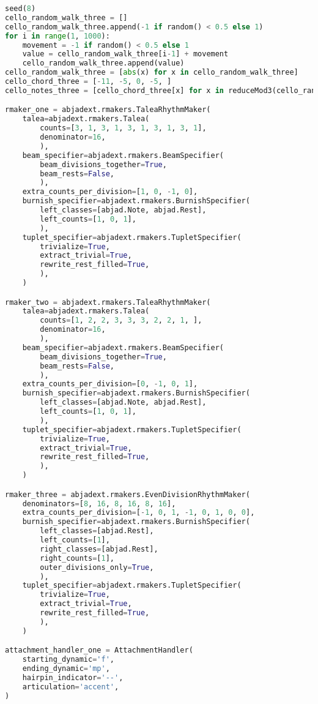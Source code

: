 \begin{lstlisting}[language=Python, caption=Four Ages of Sand Segment\_II]
seed(8)
cello_random_walk_three = []
cello_random_walk_three.append(-1 if random() < 0.5 else 1)
for i in range(1, 1000):
    movement = -1 if random() < 0.5 else 1
    value = cello_random_walk_three[i-1] + movement
    cello_random_walk_three.append(value)
cello_random_walk_three = [abs(x) for x in cello_random_walk_three]
cello_chord_three = [-11, -5, 0, -5, ]
cello_notes_three = [cello_chord_three[x] for x in reduceMod3(cello_random_walk_three)]

rmaker_one = abjadext.rmakers.TaleaRhythmMaker(
    talea=abjadext.rmakers.Talea(
        counts=[3, 1, 3, 1, 3, 1, 3, 1, 3, 1],
        denominator=16,
        ),
    beam_specifier=abjadext.rmakers.BeamSpecifier(
        beam_divisions_together=True,
        beam_rests=False,
        ),
    extra_counts_per_division=[1, 0, -1, 0],
    burnish_specifier=abjadext.rmakers.BurnishSpecifier(
        left_classes=[abjad.Note, abjad.Rest],
        left_counts=[1, 0, 1],
        ),
    tuplet_specifier=abjadext.rmakers.TupletSpecifier(
        trivialize=True,
        extract_trivial=True,
        rewrite_rest_filled=True,
        ),
    )

rmaker_two = abjadext.rmakers.TaleaRhythmMaker(
    talea=abjadext.rmakers.Talea(
        counts=[1, 2, 2, 3, 3, 3, 2, 2, 1, ],
        denominator=16,
        ),
    beam_specifier=abjadext.rmakers.BeamSpecifier(
        beam_divisions_together=True,
        beam_rests=False,
        ),
    extra_counts_per_division=[0, -1, 0, 1],
    burnish_specifier=abjadext.rmakers.BurnishSpecifier(
        left_classes=[abjad.Note, abjad.Rest],
        left_counts=[1, 0, 1],
        ),
    tuplet_specifier=abjadext.rmakers.TupletSpecifier(
        trivialize=True,
        extract_trivial=True,
        rewrite_rest_filled=True,
        ),
    )

rmaker_three = abjadext.rmakers.EvenDivisionRhythmMaker(
    denominators=[8, 16, 8, 16, 8, 16],
    extra_counts_per_division=[-1, 0, 1, -1, 0, 1, 0, 0],
    burnish_specifier=abjadext.rmakers.BurnishSpecifier(
        left_classes=[abjad.Rest],
        left_counts=[1],
        right_classes=[abjad.Rest],
        right_counts=[1],
        outer_divisions_only=True,
        ),
    tuplet_specifier=abjadext.rmakers.TupletSpecifier(
        trivialize=True,
        extract_trivial=True,
        rewrite_rest_filled=True,
        ),
    )

attachment_handler_one = AttachmentHandler(
    starting_dynamic='f',
    ending_dynamic='mp',
    hairpin_indicator='--',
    articulation='accent',
)


\end{lstlisting}

